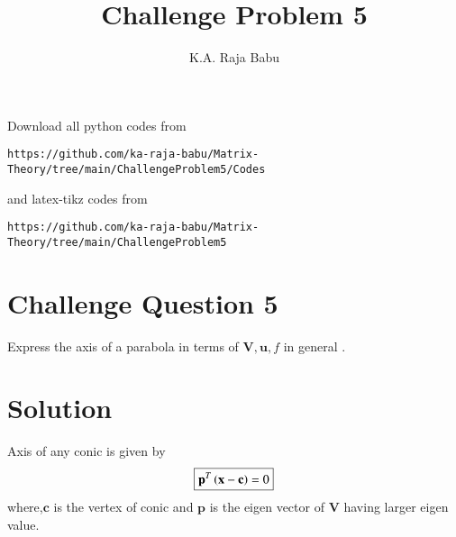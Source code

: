 \documentclass[journal,12pt,twocolumn]{IEEEtran}
\begin{document}
\makeatother
\let\StandardTheFigure\thefigure
\let\vec\mathbf
\renewcommand{\thefigure}{\theproblem}
\def\putbox#1#2#3{\makebox[0in][l]{\makebox[#1][l]{}\raisebox{\baselineskip}[0in][0in]{\raisebox{#2}[0in][0in]{#3}}}}
     \def\rightbox#1{\makebox[0in][r]{#1}}
     \def\centbox#1{\makebox[0in]{#1}}
     \def\topbox#1{\raisebox{-\baselineskip}[0in][0in]{#1}}
     \def\midbox#1{\raisebox{-0.5\baselineskip}[0in][0in]{#1}}
\vspace{3cm}
\title{Challenge Problem 5}
\author{K.A. Raja Babu}
\maketitle
\newpage
\bigskip
\renewcommand{\thefigure}{\theenumi}
\renewcommand{\thetable}{\theenumi}
Download all python codes from 
\begin{lstlisting}
https://github.com/ka-raja-babu/Matrix-Theory/tree/main/ChallengeProblem5/Codes
\end{lstlisting}
%
and latex-tikz codes from 
%
\begin{lstlisting}
https://github.com/ka-raja-babu/Matrix-Theory/tree/main/ChallengeProblem5
\end{lstlisting}
%
\section{Challenge Question 5}

Express the axis of a parabola in terms of $\vec{V},\vec{u},f$ in general .

\section{Solution}

\begin{lemma}
Axis of any conic is given by
\begin{align}
    \boxed{\vec{p}^T\brak{\vec{x}-\vec{c}} = 0}
\end{align}
where,$\vec{c}$ is the vertex of conic and $\vec{p}$ is the eigen vector of $\vec{V}$ having larger eigen value.
\end{lemma}
\end{document}
